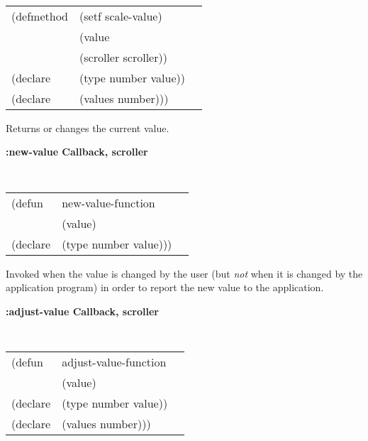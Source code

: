 \begin{flushright} \parbox[t]{6.125in}{
\tt
\begin{tabular}{lll}
\raggedright
(defmethod & (setf scale-value) & \\
         & (value \\
         & (scroller  scroller)) \\
(declare &(type number  value))\\
(declare & (values number)))
\end{tabular}
\rm}
\end{flushright}

\begin{flushright} \parbox[t]{6.125in}{
Returns or changes the current value.}
\end{flushright}







{\samepage
{\large {\bf :new-value \hfill Callback, scroller}} 
\begin{flushright} 
\parbox[t]{6.125in}{
\tt
\begin{tabular}{lll}
\raggedright
(defun & new-value-function & \\ 
& (value) \\
(declare &(type  number  value)))
\end{tabular}
\rm

}\end{flushright}}

\begin{flushright} \parbox[t]{6.125in}{
Invoked when the value is changed by the user (but {\em not} when it is changed
by the application program) in order to report the new value to the application.

}\end{flushright}



{\samepage
{\large {\bf :adjust-value \hfill Callback, scroller}} 
\begin{flushright} 
\parbox[t]{6.125in}{
\tt
\begin{tabular}{lll}
\raggedright
(defun & adjust-value-function & \\ 
& (value) \\
(declare &(type  number  value))\\
(declare & (values number)))
\end{tabular}
\rm

}\end{flushright}}

